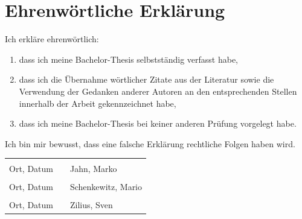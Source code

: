 \documentclass[
	12pt, %
	a4paper,
	listof=totoc, %
	bibliography=totoc, %
	numbers=noenddot, %
	ngerman, %
	headsepline, %
	oneside %
	]{scrbook} %
\newcommand{\studentNameEins}{Jahn, Marko}
\newcommand{\studentNameZwei}{Schenkewitz, Mario}
\newcommand{\studentNameDrei}{Zilius, Sven}
\begin{document}





\chapter*{Ehrenwörtliche Erklärung}

\thispagestyle{empty}

Ich erkläre ehrenwörtlich:
\begin{enumerate}
	\item dass ich meine Bachelor-Thesis selbstständig verfasst habe,
	\item dass ich die Übernahme wörtlicher Zitate aus der Literatur sowie die Verwendung der Gedanken anderer Autoren an den entsprechenden Stellen innerhalb der Arbeit gekennzeichnet habe,
	\item dass ich meine Bachelor-Thesis bei keiner anderen Prüfung vorgelegt habe.
\end{enumerate}
Ich bin mir bewusst, dass eine falsche Erklärung rechtliche Folgen haben wird.
\vspace{2cm}

\begin{tabular}{lp{4em}l} 
 \hspace{5cm}   && \hspace{6cm} \\\cline{1-1}\cline{3-3} 
 Ort, Datum     && \studentNameEins \\ [10ex]
 \hspace{5cm}   && \hspace{6cm} \\\cline{1-1}\cline{3-3} 
 Ort, Datum     && \studentNameZwei \\ [10ex]
 \hspace{5cm}   && \hspace{6cm} \\\cline{1-1}\cline{3-3} 
 Ort, Datum     && \studentNameDrei \\ [10ex]
\end{tabular}
\end{document}
